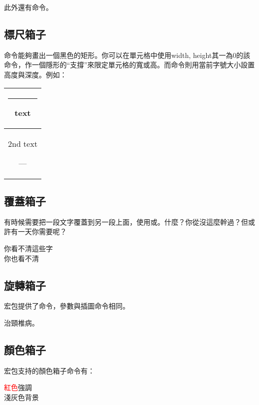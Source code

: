 此外還有命令。

\subsection{標尺箱子}
命令能夠畫出一個黑色的矩形。你可以在單元格中使用width, height其一為0的該命令，作一個隱形的“支撐”來限定單元格的寬或高。而命令則用當前字號大小設置高度與深度。例如：

\begin{codeshow}
\begin{tabular}{|c|}
  \hline
  \rule[-1em]{1em}{1ex}text
  \rule{0pt}{38pt} \\
  \hline
  2nd text\strut--- \\
  \hline
\end{tabular}
\end{codeshow}

\subsection{覆蓋箱子}
有時候需要把一段文字覆蓋到另一段上面，使用或。什麼？你從沒這麼幹過？但或許有一天你需要呢？

\begin{codeshow}
你看不清這些字\\
你也看不清
\end{codeshow}

\subsection{旋轉箱子}
宏包提供了命令，參數與插圖命令相同。
\begin{codeshow}
治頸椎病。
\end{codeshow}

\subsection{顏色箱子}
\label{subsec:colorbox}
宏包支持的顏色箱子命令有：

\begin{codeshow}
\textcolor{red}{紅色}強調\\
\colorbox[gray]{0.95}{淺灰色背景} \\
\end{codeshow}

